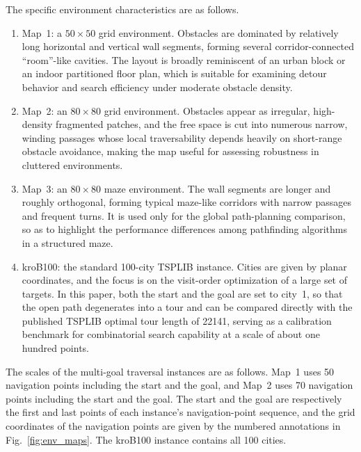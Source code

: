 \documentclass[pdflatex,sn-basic,Numbered]{sn-jnl}
\begin{document}
The specific environment characteristics are as follows.

\begin{enumerate}

\item Map~1: a $50\times 50$ grid environment. Obstacles are dominated by relatively long horizontal and vertical wall segments, forming several corridor-connected ``room''-like cavities. The layout is broadly reminiscent of an urban block or an indoor partitioned floor plan, which is suitable for examining detour behavior and search efficiency under moderate obstacle density.

\item Map~2: an $80\times 80$ grid environment. Obstacles appear as irregular, high-density fragmented patches, and the free space is cut into numerous narrow, winding passages whose local traversability depends heavily on short-range obstacle avoidance, making the map useful for assessing robustness in cluttered environments.

\item Map~3: an $80\times 80$ maze environment. The wall segments are longer and roughly orthogonal, forming typical maze-like corridors with narrow passages and frequent turns. It is used only for the global path-planning comparison, so as to highlight the performance differences among pathfinding algorithms in a structured maze.

\item kroB100: the standard 100-city TSPLIB instance. Cities are given by planar coordinates, and the focus is on the visit-order optimization of a large set of targets. In this paper, both the start and the goal are set to city~1, so that the open path degenerates into a tour and can be compared directly with the published TSPLIB optimal tour length of 22141, serving as a calibration benchmark for combinatorial search capability at a scale of about one hundred points.

\end{enumerate}

The scales of the multi-goal traversal instances are as follows. Map~1 uses 50 navigation points including the start and the goal, and Map~2 uses 70 navigation points including the start and the goal. The start and the goal are respectively the first and last points of each instance's navigation-point sequence, and the grid coordinates of the navigation points are given by the numbered annotations in Fig.~\ref{fig:env_maps}. The kroB100 instance contains all 100 cities.
\end{document}
